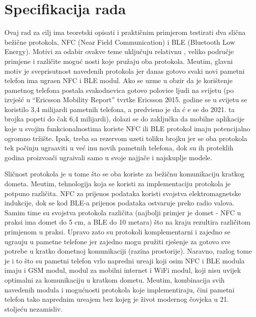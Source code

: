 \chapter{Specifikacija rada}

Ovaj rad za cilj ima teoretski opisati i prakti\v{c}nim primjerom testirati dva sli\v{c}na be\v{z}i\v{c}ne protokola, NFC (Near Field Communication) i BLE (Bluetooth Low Energy). Motivi za odabir ovakve teme uklju\v{c}uju relativnu , veliko podru\v{c}je primjene i razli\v{c}ite mogu\'{c} nosti koje pru\v{z}aju oba protokola. Me\dj utim, glavni motiv je sveprisutnost navedenih protokola jer danas gotovo svaki novi pametni telefon ima ugra\dj en NFC i BLE modul. Ako se uzme u obzir da je kori\v{s}tenje pametnog telefona postala svakodnevica gotovo polovice ljudi na svijetu (po izvje\v{s}\'{c} u ``Ericsson Mobility Report'' tvrtke Ericsson \cite{mobilityReport} 2015. godine se u svijetu se koristilo 3,4 milijardi pametnih telefona, a predvi\dj eno je da \'{c} e se do 2021. ta brojka popeti do \v{c}ak 6,4 milijardi), dolazi se do zaklju\v{c}ka da mobilne aplikacije koje u svojim funkcionalnostima koriste NFC ili BLE protokol imaju potencijalno ogromno tr\v{z}i\v{s}te. Ipak, treba sa rezervom uzeti toliku brojku jer se oba protokola tek po\v{c}inju ugra\dj aviti u ve\'{c} inu novih pametnih telefona, dok su ih proteklih godina proizvo\dj a\v{c}i ugra\dj ivali samo u svoje najja\v{c}e i najskuplje modele.

Sli\v{c}nost protokola je u tome \v{s}to se oba koriste za be\v{z}i\v{c}nu komunikaciju kratkog dometa. Me\dj utim, tehnologija koja se koristi za implementaciju protokola je potpuno razli\v{c}ita. NFC za prijenos podataka koristi svojstva elektromagnetske indukcije, dok se kod BLE-a prijenos podataka ostvaruje preko radio valova. Samim time su svojstva protokola razli\v{c}ita (najbolji primjer je domet - NFC u praksi ima domet do 5 cm, a BLE do 10 metara) \v{s}to na kraju rezultira razli\v{c}itom primjenom u praksi. Upravo zato su protokoli komplementarni i zajedno se ugra\dj uju u pametne telefone jer zajedno mogu pru\v{z}iti rje\v{s}enje za gotovo sve potrebe u kratko dometnoj komunikaciji (razina prostorije). Naravno, razlog tome je i to \v{s}to su pametni telefon vrlo napredni ure\dj aji koji osim NFC i BLE modula imaju i GSM modul, modul za mobilni internet i WiFi modul, koji nisu uvijek optimalni za komunikaciju u kratkom dometu. Me\dj utim, kombinacija svih navedenih modula i mogu\'{c}nosti protokola koje implementiraju, \v{c}ini pametni telefon tako naprednim ure\dj ajem bez kojeg je \v{z}ivot modernog \v{c}ovjeka u 21. stolje\'{c}u nezamisliv.

